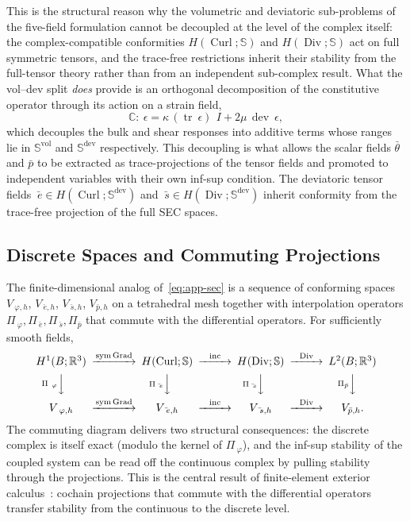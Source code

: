 \documentclass[12pt]{article}
\newcommand{\ebar}{\bar{~e}}
\newcommand{\sbar}{\bar{~s}}
\newcommand{\thbar}{\bar{\theta}}
\newcommand{\pbar}{\bar{p}}
\newcommand{\Reals}{\mathbb{R}}
\newcommand{\Syms}{\mathbb{S}}
\newcommand{\supvol}{^{\mathrm{vol}}}
\newcommand{\supdev}{^{\mathrm{dev}}}
\newcommand{\Symsd}{\mathbb{S}\supdev}
\DeclareMathOperator{\trace}{tr}
\DeclareMathOperator{\dev}{dev}
\DeclareMathOperator{\Div}{Div}
\DeclareMathOperator{\Grad}{Grad}
\DeclareMathOperator{\Curl}{Curl}
\DeclareMathOperator{\sym}{sym}
\begin{document}
This is the structural reason why the volumetric and deviatoric
sub-problems of the five-field formulation cannot be decoupled at the
level of the complex itself: the complex-compatible conformities
$H(\Curl; \Syms)$ and $H(\Div; \Syms)$ act on full symmetric tensors,
and the trace-free restrictions inherit their stability from the
full-tensor theory rather than from an independent sub-complex
result. What the vol--dev split \emph{does} provide is an
orthogonal decomposition of the constitutive operator through its
action on a strain field,
\begin{equation}
  \label{eq:app-Cvoldev}
  \mathbb{C}\!:\!~\epsilon
  =
  \kappa\,(\trace ~\epsilon)\,~I
  +
  2\mu\,\dev ~\epsilon,
\end{equation}
which decouples the bulk and shear responses into additive terms
whose ranges lie in $\Syms\supvol$ and $\Symsd$ respectively. This
decoupling is what allows the scalar fields $\thbar$ and $\pbar$ to
be extracted as trace-projections of the tensor fields and promoted
to independent variables with their own inf-sup condition. The deviatoric tensor fields $\ebar \in H(\Curl; \Symsd)$
and $\sbar \in H(\Div; \Symsd)$ inherit conformity from the
trace-free projection of the full SEC spaces.

\subsection{Discrete Spaces and Commuting Projections}
\label{app:sec-discrete}

The finite-dimensional analog of~\eqref{eq:app-sec} is a sequence of
conforming spaces $V_{~\varphi,h}$, $V_{\ebar,h}$, $V_{\sbar,h}$,
$V_{\pbar,h}$ on a tetrahedral mesh together with interpolation
operators $\Pi_{~\varphi}, \Pi_{\ebar}, \Pi_{\sbar}, \Pi_{\pbar}$
that commute with the differential operators. For sufficiently
smooth fields,
\begin{equation}
  \label{eq:app-commuting}
  \begin{CD}
    H^1(B; \Reals^3)
    @>\sym\Grad>>
    H(\Curl; \Syms)
    @>\mathrm{inc}>>
    H(\Div; \Syms)
    @>\Div>>
    L^2(B; \Reals^3)
    \\
    @V \Pi_{~\varphi} VV
    @V \Pi_{\ebar} VV
    @V \Pi_{\sbar} VV
    @V \Pi_{\pbar} VV
    \\
    V_{~\varphi,h}
    @>\sym\Grad>>
    V_{\ebar,h}
    @>\mathrm{inc}>>
    V_{\sbar,h}
    @>\Div>>
    V_{\pbar,h}.
  \end{CD}
\end{equation}
The commuting diagram delivers two structural consequences: the
discrete complex is itself exact (modulo the kernel of
$\Pi_{~\varphi}$), and the inf-sup stability of the coupled system
can be read off the continuous complex by pulling stability through
the projections. This is the central result of finite-element
exterior calculus~\citep{Arnold.Falk.Winther:2010}: cochain
projections that commute with the differential operators transfer
stability from the continuous to the discrete level.
\end{document}
